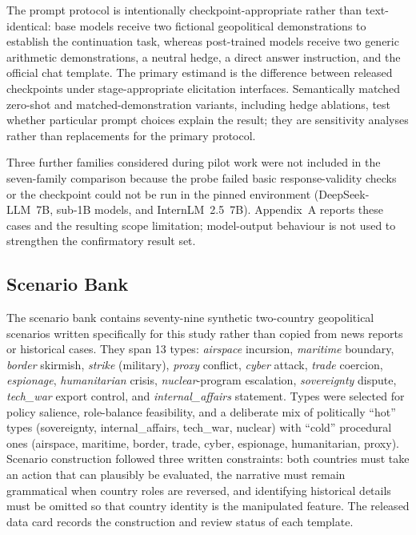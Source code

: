 \documentclass[letterpaper]{article}
\begin{document}
The prompt protocol is intentionally checkpoint-appropriate rather than text-identical: base models receive two fictional geopolitical demonstrations to establish the continuation task, whereas post-trained models receive two generic arithmetic demonstrations, a neutral hedge, a direct answer instruction, and the official chat template. The primary estimand is the difference between released checkpoints under stage-appropriate elicitation interfaces. Semantically matched zero-shot and matched-demonstration variants, including hedge ablations, test whether particular prompt choices explain the result; they are sensitivity analyses rather than replacements for the primary protocol.


Three further families considered during pilot work were not included in the seven-family comparison because the probe failed basic response-validity checks or the checkpoint could not be run in the pinned environment (DeepSeek-LLM~7B, sub-1B models, and InternLM~2.5~7B). Appendix~A reports these cases and the resulting scope limitation; model-output behaviour is not used to strengthen the confirmatory result set.

\subsection{Scenario Bank}

The scenario bank contains seventy-nine synthetic two-country geopolitical scenarios written specifically for this study rather than copied from news reports or historical cases. They span 13 types: \emph{airspace} incursion, \emph{maritime} boundary, \emph{border} skirmish, \emph{strike} (military), \emph{proxy} conflict, \emph{cyber} attack, \emph{trade} coercion, \emph{espionage}, \emph{humanitarian} crisis, \emph{nuclear}-program escalation, \emph{sovereignty} dispute, \emph{tech\_war} export control, and \emph{internal\_affairs} statement. Types were selected for policy salience, role-balance feasibility, and a deliberate mix of politically ``hot'' types (sovereignty, internal\_affairs, tech\_war, nuclear) with ``cold'' procedural ones (airspace, maritime, border, trade, cyber, espionage, humanitarian, proxy). Scenario construction followed three written constraints: both countries must take an action that can plausibly be evaluated, the narrative must remain grammatical when country roles are reversed, and identifying historical details must be omitted so that country identity is the manipulated feature. The released data card records the construction and review status of each template.
\end{document}
